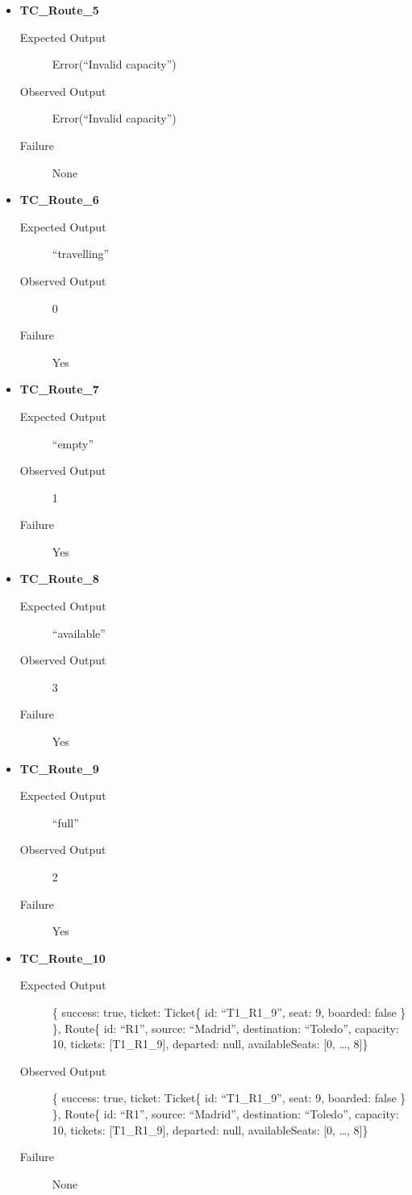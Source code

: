 \documentclass[11pt]{article}
\begin{document}
\begin{itemize}
\item \textbf{TC\_Route\_5}
\begin{description}
\item[{Expected Output}] Error(“Invalid capacity”)
\item[{Observed Output}] Error(“Invalid capacity”)
\item[{Failure}] None
\end{description}

\item \textbf{TC\_Route\_6}
\begin{description}
\item[{Expected Output}] “travelling”
\item[{Observed Output}] 0
\item[{Failure}] Yes
\end{description}

\item \textbf{TC\_Route\_7}
\begin{description}
\item[{Expected Output}] “empty”
\item[{Observed Output}] 1
\item[{Failure}] Yes
\end{description}

\item \textbf{TC\_Route\_8}
\begin{description}
\item[{Expected Output}] “available”
\item[{Observed Output}] 3
\item[{Failure}] Yes
\end{description}

\item \textbf{TC\_Route\_9}
\begin{description}
\item[{Expected Output}] “full”
\item[{Observed Output}] 2
\item[{Failure}] Yes
\end{description}

\item \textbf{TC\_Route\_10}
\begin{description}
\item[{Expected Output}] \{ success: true, ticket:  Ticket\{ id: “T1\_R1\_9”, seat: 9, boarded: false \} \},
Route\{ id: “R1”, source: “Madrid”, destination: “Toledo”, capacity: 10,  tickets: [T1\_R1\_9], departed: null, availableSeats: [0, …, 8]\}
\item[{Observed Output}] \{ success: true, ticket:  Ticket\{ id: “T1\_R1\_9”, seat: 9, boarded: false \} \},
Route\{ id: “R1”, source: “Madrid”, destination: “Toledo”, capacity: 10,  tickets: [T1\_R1\_9], departed: null, availableSeats: [0, …, 8]\}
\item[{Failure}] None
\end{description}


\end{itemize}
\end{document}
